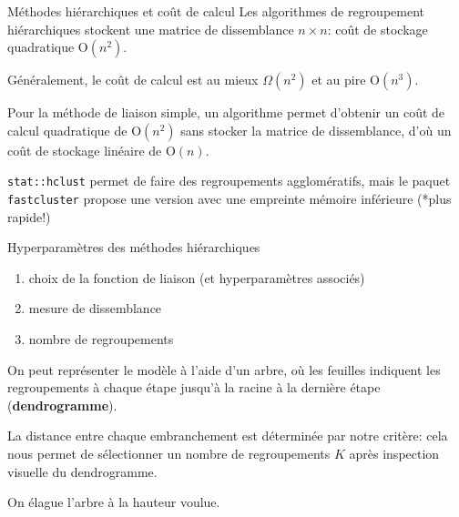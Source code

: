 \documentclass[
  ignorenonframetext,
]{beamer}
\providecommand{\tightlist}{%
  \setlength{\itemsep}{0pt}\setlength{\parskip}{0pt}}\usepackage{longtable,booktabs,array}
\begin{document}
\begin{frame}[fragile]{Méthodes hiérarchiques et coût de calcul}
\protect\hypertarget{muxe9thodes-hiuxe9rarchiques-et-couxfbt-de-calcul}{}
Les algorithmes de regroupement hiérarchiques stockent une matrice de
dissemblance \(n \times n\): coût de stockage quadratique
\(\mathrm{O}(n^2)\).

Généralement, le coût de calcul est au mieux \(\Omega(n^2)\) et au pire
\(\mathrm{O}(n^3)\).

Pour la méthode de liaison simple, un algorithme permet d'obtenir un
coût de calcul quadratique de \(\mathrm{O}(n^2)\) sans stocker la
matrice de dissemblance, d'où un coût de stockage linéaire de
\(\mathrm{O}(n)\).

\texttt{stat::hclust} permet de faire des regroupements agglomératifs,
mais le paquet \texttt{fastcluster} propose une version avec une
empreinte mémoire inférieure (*plus rapide!)
\end{frame}

\begin{frame}{Hyperparamètres des méthodes hiérarchiques}
\protect\hypertarget{hyperparamuxe8tres-des-muxe9thodes-hiuxe9rarchiques}{}
\begin{enumerate}
\tightlist
\item
  choix de la fonction de liaison (et hyperparamètres associés)
\item
  mesure de dissemblance
\item
  nombre de regroupements
\end{enumerate}

On peut représenter le modèle à l'aide d'un arbre, où les feuilles
indiquent les regroupements à chaque étape jusqu'à la racine à la
dernière étape (\textbf{dendrogramme}).

La distance entre chaque embranchement est déterminée par notre critère:
cela nous permet de sélectionner un nombre de regroupements \(K\) après
inspection visuelle du dendrogramme.

On élague l'arbre à la hauteur voulue.
\end{frame}
\end{document}
